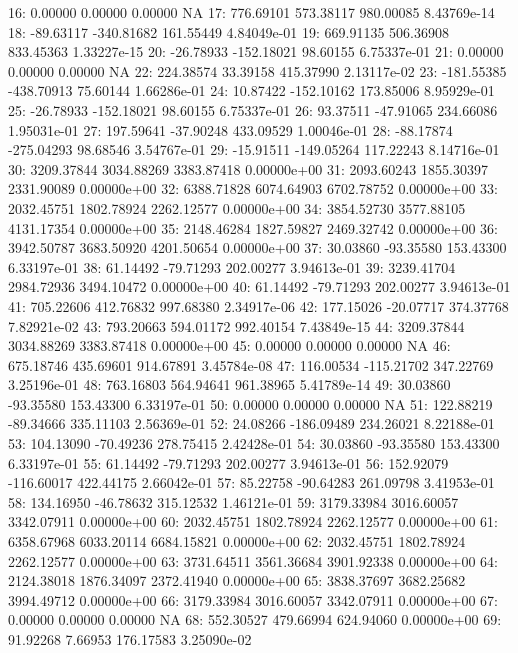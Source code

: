 \begin{Schunk}
\begin{Soutput}
16:    0.00000    0.00000    0.00000          NA
17:  776.69101  573.38117  980.00085 8.43769e-14
18:  -89.63117 -340.81682  161.55449 4.84049e-01
19:  669.91135  506.36908  833.45363 1.33227e-15
20:  -26.78933 -152.18021   98.60155 6.75337e-01
21:    0.00000    0.00000    0.00000          NA
22:  224.38574   33.39158  415.37990 2.13117e-02
23: -181.55385 -438.70913   75.60144 1.66286e-01
24:   10.87422 -152.10162  173.85006 8.95929e-01
25:  -26.78933 -152.18021   98.60155 6.75337e-01
26:   93.37511  -47.91065  234.66086 1.95031e-01
27:  197.59641  -37.90248  433.09529 1.00046e-01
28:  -88.17874 -275.04293   98.68546 3.54767e-01
29:  -15.91511 -149.05264  117.22243 8.14716e-01
30: 3209.37844 3034.88269 3383.87418 0.00000e+00
31: 2093.60243 1855.30397 2331.90089 0.00000e+00
32: 6388.71828 6074.64903 6702.78752 0.00000e+00
33: 2032.45751 1802.78924 2262.12577 0.00000e+00
34: 3854.52730 3577.88105 4131.17354 0.00000e+00
35: 2148.46284 1827.59827 2469.32742 0.00000e+00
36: 3942.50787 3683.50920 4201.50654 0.00000e+00
37:   30.03860  -93.35580  153.43300 6.33197e-01
38:   61.14492  -79.71293  202.00277 3.94613e-01
39: 3239.41704 2984.72936 3494.10472 0.00000e+00
40:   61.14492  -79.71293  202.00277 3.94613e-01
41:  705.22606  412.76832  997.68380 2.34917e-06
42:  177.15026  -20.07717  374.37768 7.82921e-02
43:  793.20663  594.01172  992.40154 7.43849e-15
44: 3209.37844 3034.88269 3383.87418 0.00000e+00
45:    0.00000    0.00000    0.00000          NA
46:  675.18746  435.69601  914.67891 3.45784e-08
47:  116.00534 -115.21702  347.22769 3.25196e-01
48:  763.16803  564.94641  961.38965 5.41789e-14
49:   30.03860  -93.35580  153.43300 6.33197e-01
50:    0.00000    0.00000    0.00000          NA
51:  122.88219  -89.34666  335.11103 2.56369e-01
52:   24.08266 -186.09489  234.26021 8.22188e-01
53:  104.13090  -70.49236  278.75415 2.42428e-01
54:   30.03860  -93.35580  153.43300 6.33197e-01
55:   61.14492  -79.71293  202.00277 3.94613e-01
56:  152.92079 -116.60017  422.44175 2.66042e-01
57:   85.22758  -90.64283  261.09798 3.41953e-01
58:  134.16950  -46.78632  315.12532 1.46121e-01
59: 3179.33984 3016.60057 3342.07911 0.00000e+00
60: 2032.45751 1802.78924 2262.12577 0.00000e+00
61: 6358.67968 6033.20114 6684.15821 0.00000e+00
62: 2032.45751 1802.78924 2262.12577 0.00000e+00
63: 3731.64511 3561.36684 3901.92338 0.00000e+00
64: 2124.38018 1876.34097 2372.41940 0.00000e+00
65: 3838.37697 3682.25682 3994.49712 0.00000e+00
66: 3179.33984 3016.60057 3342.07911 0.00000e+00
67:    0.00000    0.00000    0.00000          NA
68:  552.30527  479.66994  624.94060 0.00000e+00
69:   91.92268    7.66953  176.17583 3.25090e-02

\end{Soutput}
\end{Schunk}
